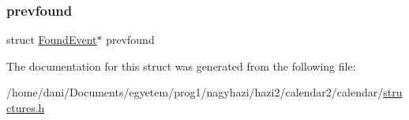\mbox{\label{struct_found_event_add29159b298db5eb8c68bd9314e7c498}} 
\subsubsection{\texorpdfstring{prevfound}{prevfound}}
{\footnotesize\ttfamily struct \hyperlink{struct_found_event}{Found\+Event}$\ast$ prevfound}



The documentation for this struct was generated from the following file\+:\begin{DoxyCompactItemize}
\item 
/home/dani/\+Documents/egyetem/prog1/nagyhazi/hazi2/calendar2/calendar/\hyperlink{structures_8h}{structures.\+h}\end{DoxyCompactItemize}
